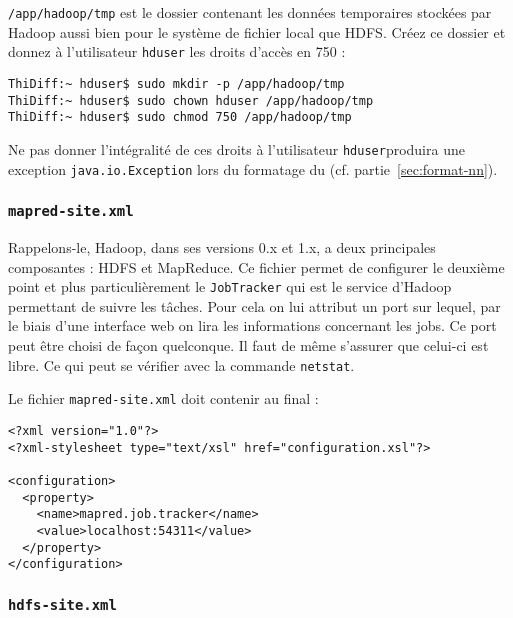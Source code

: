 \par \texttt{/app/hadoop/tmp} est le dossier contenant les données temporaires stockées par Hadoop aussi bien pour le système de fichier local que HDFS. Créez ce dossier et donnez à l'utilisateur \texttt{hduser} les droits d'accès en 750 :

\begin{verbatim}
ThiDiff:~ hduser$ sudo mkdir -p /app/hadoop/tmp
ThiDiff:~ hduser$ sudo chown hduser /app/hadoop/tmp
ThiDiff:~ hduser$ sudo chmod 750 /app/hadoop/tmp
\end{verbatim}

\par Ne pas donner l'intégralité de ces droits à l'utilisateur \texttt{hduser}produira une exception \texttt{java.io.Exception} lors du formatage du  (cf. partie~\ref{sec:format-nn}).

\subsubsection{\texttt{mapred-site.xml}}
\label{sec:mapred-site.xml}

\par Rappelons-le, Hadoop, dans ses versions 0.x et 1.x, a deux principales composantes : HDFS et MapReduce. Ce fichier permet de configurer le deuxième point et plus particulièrement le \texttt{JobTracker} qui est le service d'Hadoop permettant de suivre les tâches. Pour cela on lui attribut un port sur lequel, par le biais d'une interface web on lira les informations concernant les jobs. Ce port peut être choisi de façon quelconque. Il faut de même s'assurer que celui-ci est libre. Ce qui peut se vérifier avec la commande \texttt{netstat}.

\par Le fichier \texttt{mapred-site.xml} doit contenir au final :

\begin{verbatim}
<?xml version="1.0"?>
<?xml-stylesheet type="text/xsl" href="configuration.xsl"?>

<configuration>
  <property>
    <name>mapred.job.tracker</name>
    <value>localhost:54311</value>
  </property>
</configuration>
\end{verbatim}

\subsubsection{\texttt{hdfs-site.xml}}
\label{sec:hdfs-site.xml}

